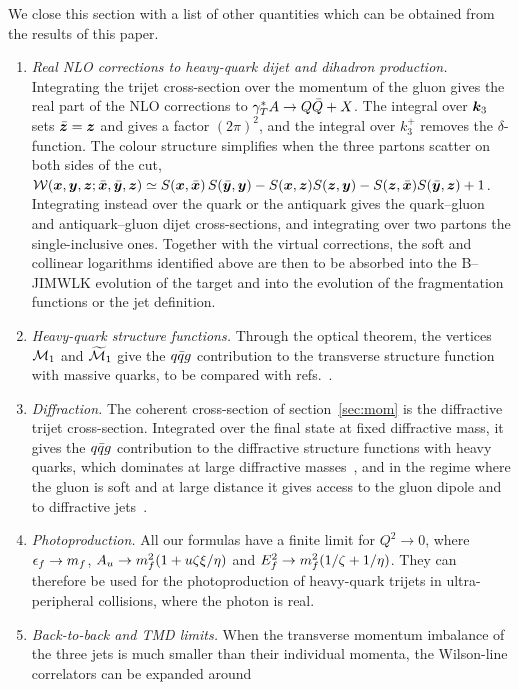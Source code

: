 We close this section with a list of other quantities which can be obtained from the results of this
paper.
\begin{enumerate}
\item \emph{Real NLO corrections to heavy-quark dijet and dihadron production.} Integrating the trijet
cross-section over the momentum of the gluon gives the real part of the NLO corrections to
$\gamma^{*}_{T} A\to Q\bar Q+X$. The integral over $\bm{k}_3$ sets $\bar{\bm{z}}=\bm{z}$ and gives a factor $(2\pi)^2$, and the
integral over $k_3^+$ removes the $\delta$-function. The colour structure simplifies when the three
partons scatter on both sides of the cut,
$\mathcal{W}(\bm{x},\bm{y},\bm{z};\bar{\bm{x}},\bar{\bm{y}},\bm{z})\simeq S(\bm{x},\bar{\bm{x}})\,S(\bar{\bm{y}},\bm{y})-S(\bm{x},\bm{z})S(\bm{z},\bm{y})-S(\bm{z},\bar{\bm{x}})S(\bar{\bm{y}},\bm{z})+1$. Integrating
instead over the quark or the antiquark gives the quark--gluon and antiquark--gluon dijet
cross-sections, and integrating over two partons the single-inclusive ones. Together with the
virtual corrections, the soft and collinear logarithms identified above are then to be absorbed into
the B--JIMWLK evolution of the target and into the evolution of the fragmentation functions or the
jet definition.
\item \emph{Heavy-quark structure functions.} Through the optical theorem, the vertices $\mathcal{M}_1$ and
$\widetilde{\mathcal{M}}_1$ give the $q\bar q g$ contribution to the transverse structure function with massive quarks, to be
compared with refs.~\cite{Beuf:2021srj,Beuf:2022ndu}.
\item \emph{Diffraction.} The coherent cross-section of section~\ref{sec:mom} is the diffractive trijet
cross-section. Integrated over the final state at fixed diffractive mass, it gives the $q\bar q g$
contribution to the diffractive structure functions with heavy quarks, which dominates at large
diffractive masses~\cite{Wusthoff:1997fz,GolecBiernat:1999qd,Kovchegov:1999ji,Beuf:2022kyp}, and in the
regime where the gluon is soft and at large distance it gives access to the gluon dipole and to
diffractive jets~\cite{Iancu:2021rup,Iancu:2022lcw}.
\item \emph{Photoproduction.} All our formulas have a finite limit for $Q^2\to0$, where $\epsilon_f\to m_f$,
$A_u\to m_f^2(1+u\zeta\xi/\eta)$ and $E_f^2\to m_f^2(1/\zeta+1/\eta)$. They can therefore be used for the
photoproduction of heavy-quark trijets in ultra-peripheral collisions, where the photon is real.
\item \emph{Back-to-back and TMD limits.} When the transverse momentum imbalance of the three jets is
much smaller than their individual momenta, the Wilson-line correlators can be expanded around

\end{enumerate}
